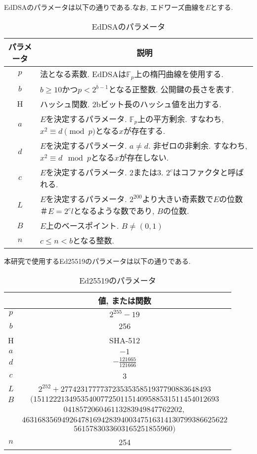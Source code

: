 EdDSAのパラメータは以下の通りである.なお, エドワーズ曲線を$E$とする.\\
\begin{table}[htbp]
  \centering
  \begin{tabular}{cp{10cm}}
    \hline
    \multicolumn{1}{c}{パラメータ} & \multicolumn{1}{c}{説明} \\ \hline \hline
    $p$ & 法となる素数. EdDSAは$\mathbb{F}_p$上の楕円曲線を使用する.\\
    $b$ & $b\geq 10$かつ$p<2^{b-1}$となる正整数. 公開鍵の長さを表す.\\
    H & ハッシュ関数. 2bビット長のハッシュ値を出力する. \\
    $a$ & $E$を決定するパラメータ. $\mathbb{F}_p$上の平方剰余. すなわち, $x^2\equiv d \pmod{p}$となる$x$が存在する.\\
    $d$ & $E$を決定するパラメータ. $a\neq d$. 非ゼロの非剰余. すなわち, $x^2\equiv d \mod{p}$となる$x$が存在しない.\\
    $c$ & $E$を決定するパラメータ. $2$または$3$. $2^{c}$はコファクタと呼ばれる.\\
    $L$ & $E$を決定するパラメータ. $2^{200}$より大きい奇素数で$E$の位数$＃E=2^{c}l$となるような数であり, $B$の位数.\\
    $B$ & $E$上のベースポイント. $B\neq (0,1)$\\
    $n$ & $c\leq n < b$となる整数.\\ \hline
  \end{tabular}
  \caption{EdDSAのパラメータ}
\end{table}

本研究で使用するEd25519のパラメータは以下の通りである.\\
\begin{longtable}{cc}
  \caption{Ed25519のパラメータ}
  \endlastfoot
  \hline
  \multicolumn{1}{c}{パラメータ} & \multicolumn{1}{c}{値, または関数} \\ \hline \hline
  $p$ & $2^{255}-19$ \\
  $b$ & 256 \\
  H & SHA-512 \\
  $a$ & $-1$ \\
  $d$ & $-\frac{121665}{121666}$ \\
  $c$ & 3 \\
  $L$ & $2^{252} + 27742317777372353535851937790883648493$ \\
  $B$ & $(15112221349535400772501151409588531511454012693$ \\
  & $041857206046113283949847762202,$\\
  & $4631683569492647816942839400347516314130799386625622$ \\
  & $5615783033603165251855960)$ \\
  $n$ & 254 \\ \hline
\end{longtable}

